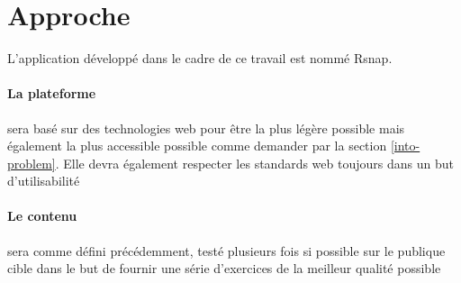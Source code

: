 \section{Approche}
\label{intro-approche}
L'application développé dans le cadre de ce travail est nommé Rsnap.

\paragraph{La plateforme} sera basé sur des technologies web pour être la plus légère possible mais également la plus accessible possible comme demander par la section \ref{into-problem}. Elle devra également respecter les standards web toujours dans un but d'utilisabilité

\paragraph{Le contenu} sera comme défini précédemment, testé plusieurs fois si possible sur le publique cible dans le but de fournir une série d'exercices de la meilleur qualité possible
